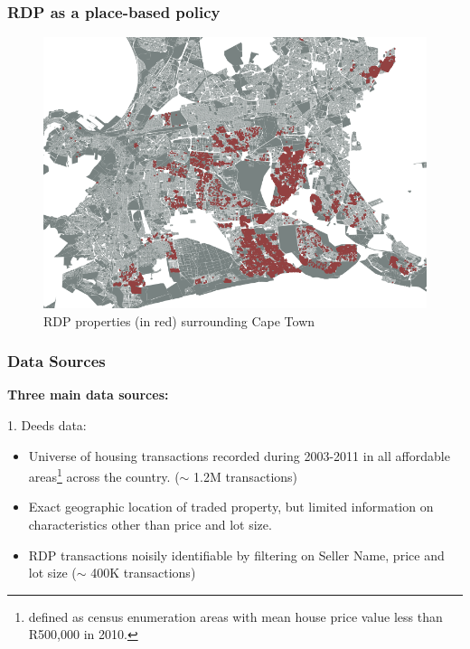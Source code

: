 \documentclass[aspectratio=149]{beamer}
\begin{document}

\begin{frame}
\frametitle{RDP as a place-based policy}
\begin{center}
\begin{figure}
\includegraphics[scale=0.33]{map.png}
\vspace{-3mm}
\caption{RDP properties (in red) surrounding Cape Town}
\end{figure}
\end{center}

\end{frame}



\begin{frame}
\frametitle{Data Sources}
\vspace{-1em}
{\bf Three main data sources: }

\vspace{1em}

1. Deeds data:
\vspace{2mm}
  \begin{itemize}
    \item Universe of housing transactions recorded during 2003-2011 in all affordable areas\footnote{defined as census enumeration areas with mean house price value less than R500,000 in 2010.} across the country. ($\sim$\! 1.2M transactions)
    \vspace{2mm}
    \item Exact geographic location of traded property, but limited information on characteristics other than price and lot size.
    \vspace{2mm}
    \item RDP transactions noisily identifiable by filtering on Seller Name, price and lot size ($\sim$\! 400K transactions)
\end{itemize}
\end{frame}
\end{document}
